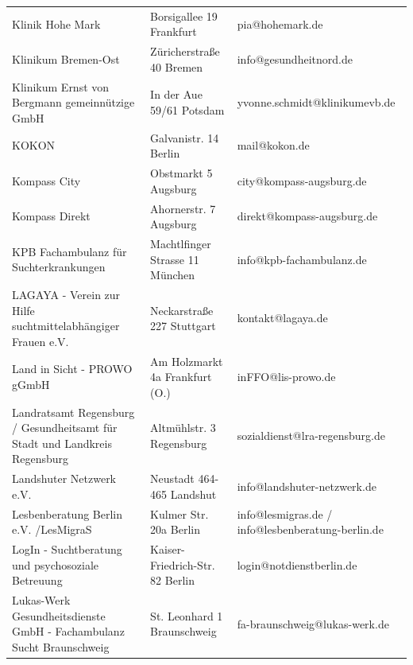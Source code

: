 {\begin{xltabular}{\textwidth} {
 >{\raggedright\arraybackslash}p{5cm}
 >{\raggedright\arraybackslash}X
 >{\raggedright\arraybackslash}p{5cm} }
Klinik Hohe Mark & Borsigallee 19 Frankfurt & pia@hohemark.de \\
Klinikum Bremen-Ost & Züricherstraße 40 Bremen & info@gesundheitnord.de \\
Klinikum Ernst von Bergmann gemeinnützige GmbH & In der Aue 59/61 Potsdam & yvonne.schmidt@klinikumevb.de \\
KOKON & Galvanistr. 14 Berlin & mail@kokon.de \\
Kompass City & Obstmarkt 5 Augsburg & city@kompass-augsburg.de \\
Kompass Direkt & Ahornerstr. 7 Augsburg & direkt@kompass-augsburg.de \\
KPB Fachambulanz für Suchterkrankungen & Machtlfinger Strasse 11 München & info@kpb-fachambulanz.de \\
LAGAYA - Verein zur Hilfe suchtmittelabhängiger Frauen e.V. & Neckarstraße 227 Stuttgart & kontakt@lagaya.de \\
Land in Sicht - PROWO gGmbH & Am Holzmarkt 4a Frankfurt (O.) & inFFO@lis-prowo.de \\
Landratsamt Regensburg / Gesundheitsamt für Stadt und Landkreis Regensburg & Altmühlstr. 3 Regensburg & sozialdienst@lra-regensburg.de \\
Landshuter Netzwerk e.V. & Neustadt 464-465 Landshut & info@landshuter-netzwerk.de \\
Lesbenberatung Berlin e.V. /LesMigraS & Kulmer Str. 20a Berlin & info@lesmigras.de / info@lesbenberatung-berlin.de \\
LogIn - Suchtberatung und psychosoziale Betreuung & Kaiser-Friedrich-Str. 82 Berlin & login@notdienstberlin.de \\
Lukas-Werk Gesundheitsdienste GmbH - Fachambulanz Sucht Braunschweig & St. Leonhard 1 Braunschweig & fa-braunschweig@lukas-werk.de \\

\end{xltabular}}
